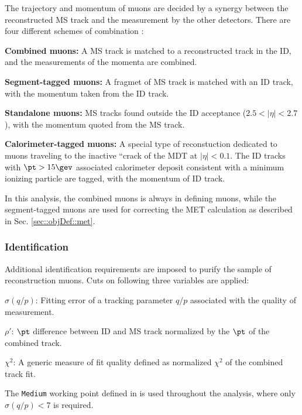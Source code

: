 The trajectory and momentum of muons are decided by a synergy between the reconstructed MS track and the measurement by the other detectors.
There are four different schemes of combination \cite{165_muonPerf2011_2012}:
\begin{description}
\item \textbf{Combined muons:} 
A MS track is matched to a reconstructed track in the ID, and the measurements of the momenta are combined.

\item \textbf{Segment-tagged muons:} 
  A fragmet of MS track is matched with an ID track, with the momentum taken from the ID track.

\item \textbf{Standalone muons:} 
  MS tracks found outside the ID acceptance ($2.5 < |\eta| < 2.7$), with the momentum quoted from the MS track.

\item \textbf{Calorimeter-tagged muons:}
  A special type of reconstuction dedicated to muons traveling to the inactive “crack of the MDT at $|\eta|<0.1$.
  The ID tracks with $\pt>15\gev$ associated calorimeter deposit consistent with a minimum ionizing particle are tagged, with the momentum of ID track.
\end{description}
In this analysis, the combined muons is always in defining muons, while the segment-tagged muons are used for correcting the MET calculation as described in Sec. \ref{sec::objDef::met}.



\subsubsection{Identification} \label{sec::objDef::muons::id}
Additional identification requirements are imposed to purify the sample of reconstruction muons.
Cuts on following three variables are applied:
\begin{description}
\item $\sigma(q/p)$: Fitting error of a tracking parameter $q/p$ associated with the quality of measurement. \\
\item $\rho'$:     \mbox{\phantom{MM}}  $\pt$ difference between ID and MS track normalized by the $\pt$ of the combined track. \\
\item $\chi^2$:   \mbox{\phantom{MM}}  
  A generic measure of fit quality defined as normalized $\chi^2$ of the combined track fit.
\end{description}
The \texttt{Medium} working point defined in \cite{166_muonPerformance2015data} is used throughout the analysis, 
where only $\sigma(q/p)<7$ is required.  \\

